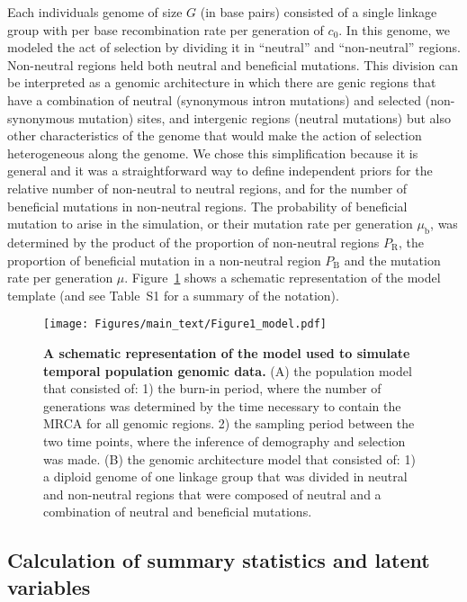 \documentclass[a4paper, 12pt]{article}
\begin{document}
Each individuals genome of size $G$ (in base pairs) consisted of a single linkage group with per base recombination rate per generation of $c_\mathrm{0}$. In this genome, we modeled the act of selection by dividing it in ``neutral'' and ``non-neutral'' regions. Non-neutral regions held both neutral and beneficial mutations. This division can be interpreted as a genomic architecture in which there are genic regions that have a combination of neutral (synonymous intron mutations) and selected (non-synonymous mutation) sites, and intergenic regions (neutral mutations) but also other characteristics of the genome that would make the action of selection heterogeneous along the genome. We chose this simplification because it is general and it was a straightforward way to define independent priors for the relative number of non-neutral to neutral regions, and for the number of beneficial mutations in non-neutral regions. The probability of beneficial mutation to arise in the simulation, or their mutation rate per generation $\mu_\mathrm{b}$, was determined by the product of the proportion of non-neutral regions $P_\mathrm{R}$, the proportion of beneficial mutation in a non-neutral region $P_\mathrm{B}$ and the mutation rate per generation $\mu$. Figure~\ref{fig:model} shows a schematic representation of the model template (and see Table~S1 for a summary of the notation).


\begin{figure}[ht]
  \centering
  \texttt{[image: Figures/main\_text/Figure1\_model.pdf]}
  \small\caption{\textbf{A schematic representation of the model used to simulate temporal population genomic data.} (A) the population model that consisted of: 1) the burn-in period, where the number of generations was determined by the time necessary to contain the MRCA for all genomic regions. 2) the sampling period between the two time points, where the inference of demography and selection was made. (B) the genomic architecture model that consisted of: 1) a diploid genome of one linkage group that was divided in neutral and non-neutral regions that were composed of neutral and a combination of neutral and beneficial mutations.}\label{fig:model}
\end{figure}

\subsection*{Calculation of summary statistics and latent variables}
\end{document}
